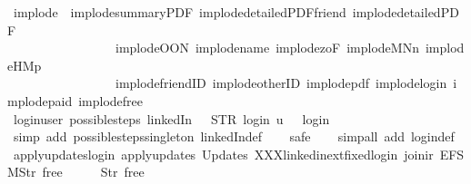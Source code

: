 \begin{isabellebody}
\endisatagproof
{\isafoldproof}%
%
\isadelimproof
\isanewline
%
\endisadelimproof
\isanewline
{}\isamarkupfalse%
\ implode\ {\isacharequal}\ implode{\isacharunderscore}summaryPDF\ implode{\isacharunderscore}detailedPDF{\isacharunderscore}friend\ implode{\isacharunderscore}detailedPDF\ \isanewline
\ \ \ \ \ \ \ \ \ \ \ \ \ \ \ \ \ implode{\isacharunderscore}OON\ implode{\isacharunderscore}name\ implode{\isacharunderscore}{}zoF\ implode{\isacharunderscore}MNn{}\ implode{\isacharunderscore}HM{}p\isanewline
\ \ \ \ \ \ \ \ \ \ \ \ \ \ \ \ \ implode{\isacharunderscore}friendID\ implode{\isacharunderscore}otherID\ implode{\isacharunderscore}pdf\ implode{\isacharunderscore}login\ implode{\isacharunderscore}paid\ implode{\isacharunderscore}free\isanewline
\isanewline
{}\isamarkupfalse%
\ login{\isacharunderscore}user{\isacharcolon}\ {\isachardoublequoteopen}possible{\isacharunderscore}steps\ linkedIn\ {}\ {\isacharless}{\isachargreater}\ STR\ {\isacharprime}{\isacharprime}login{\isacharprime}{\isacharprime}\ {\isacharbrackleft}u{\isacharbrackright}\ {\isacharequal}\ {\isacharbraceleft}{\isacharbar}{\isacharparenleft}{}{\isacharcomma}\ login{\isacharparenright}{\isacharbar}{\isacharbraceright}{\isachardoublequoteclose}\isanewline
%
\isadelimproof
\ \ %
\endisadelimproof
%
\isatagproof
{}\isamarkupfalse%
\ {\isacharparenleft}simp\ add{\isacharcolon}\ possible{\isacharunderscore}steps{\isacharunderscore}singleton\ linkedIn{\isacharunderscore}def{\isacharparenright}\isanewline
\ \ \isamarkupfalse%
\ safe\isanewline
\ \ \isamarkupfalse%
\ {\isacharparenleft}simp{\isacharunderscore}all\ add{\isacharcolon}\ login{\isacharunderscore}def{\isacharparenright}%
\endisatagproof
{\isafoldproof}%
%
\isadelimproof
\isanewline
%
\endisadelimproof
\isanewline
{}\isamarkupfalse%
\ apply{\isacharunderscore}updates{\isacharunderscore}login{\isacharcolon}\ {\isachardoublequoteopen}apply{\isacharunderscore}updates\ {\isacharparenleft}Updates\ XXXlinkedin{\isacharunderscore}ext{\isacharunderscore}fixed{\isachardot}login{\isacharparenright}\ {\isacharparenleft}join{\isacharunderscore}ir\ {\isacharbrackleft}EFSM{\isachardot}Str\ {\isacharprime}{\isacharprime}free{\isacharprime}{\isacharprime}{\isacharbrackright}\ {\isacharless}{\isachargreater}{\isacharparenright}\ {\isacharless}{\isachargreater}\ {\isacharequal}\ {\isacharless}{}\ {\isacharcolon}{\isacharequal}\ Str\ {\isacharprime}{\isacharprime}free{\isacharprime}{\isacharprime}{\isachargreater}{\isachardoublequoteclose}\isanewline

\end{isabellebody}
